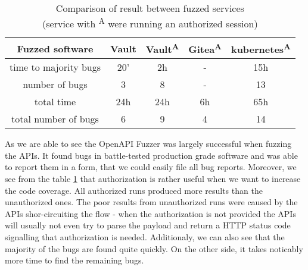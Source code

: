 \paragraph{}
\begin{table}[h]
\begin{center}
\begin{tabular}{|c|c c c c|}
\hline
Fuzzed software & Vault & Vault\textsuperscript{A} & Gitea\textsuperscript{A} & kubernetes\textsuperscript{A} \\
\hline
time to majority bugs & 20' & 2h  & -  & 15h \\
number of bugs        & 3   & 8   & -  & 13  \\
\hline
total time            & 24h & 24h & 6h & 65h \\
total number of bugs  & 6   & 9   & 4  & 14  \\
\hline
\end{tabular}
\caption[Comparison of result between fuzzed services]{Comparison of result between fuzzed services\\(service with \textsuperscript{A} were running an authorized session)}
\label{table:fuzzed-software}
\end{center}
\end{table}

As we are able to see the OpenAPI Fuzzer was largely successful when fuzzing the APIs. It found bugs in battle-tested production grade software and was able to report them in a form, that we could easily file all bug reports. Moreover, we see from the table \ref{table:fuzzed-software} that authorization is rather useful when we want to increase the code coverage. All authorized runs produced more results than the unauthorized ones. The poor results from unauthorized runs were caused by the APIs shor-circuiting the flow - when the authorization is not provided the APIs will usually not even try to parse the payload and return a HTTP status code signalling that authorization is needed. Additionaly, we can also see that the majority of the bugs are found quite quickly. On the other side, it takes noticably more time to find the remaining bugs.
